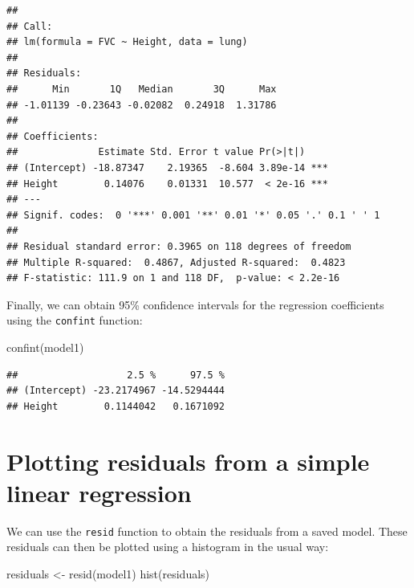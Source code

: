 \documentclass[
]{memoir}
\newenvironment{Shaded}{\begin{snugshade}}{\end{snugshade}}
\newcommand{\FunctionTok}[1]{\textcolor[rgb]{0.00,0.00,0.00}{#1}}
\newcommand{\NormalTok}[1]{#1}
\newcommand{\OtherTok}[1]{\textcolor[rgb]{0.56,0.35,0.01}{#1}}
\begin{document}
\begin{verbatim}
## 
## Call:
## lm(formula = FVC ~ Height, data = lung)
## 
## Residuals:
##      Min       1Q   Median       3Q      Max 
## -1.01139 -0.23643 -0.02082  0.24918  1.31786 
## 
## Coefficients:
##              Estimate Std. Error t value Pr(>|t|)    
## (Intercept) -18.87347    2.19365  -8.604 3.89e-14 ***
## Height        0.14076    0.01331  10.577  < 2e-16 ***
## ---
## Signif. codes:  0 '***' 0.001 '**' 0.01 '*' 0.05 '.' 0.1 ' ' 1
## 
## Residual standard error: 0.3965 on 118 degrees of freedom
## Multiple R-squared:  0.4867, Adjusted R-squared:  0.4823 
## F-statistic: 111.9 on 1 and 118 DF,  p-value: < 2.2e-16
\end{verbatim}

Finally, we can obtain 95\% confidence intervals for the regression coefficients using the \texttt{confint} function:

\begin{Shaded}
\begin{Highlighting}[]
\FunctionTok{confint}\NormalTok{(model1)}
\end{Highlighting}
\end{Shaded}

\begin{verbatim}
##                   2.5 %      97.5 %
## (Intercept) -23.2174967 -14.5294444
## Height        0.1144042   0.1671092
\end{verbatim}

\hypertarget{plotting-residuals-from-a-simple-linear-regression}{%
\section{Plotting residuals from a simple linear regression}\label{plotting-residuals-from-a-simple-linear-regression}}

We can use the \texttt{resid} function to obtain the residuals from a saved model. These residuals can then be plotted using a histogram in the usual way:

\begin{Shaded}
\begin{Highlighting}[]
\NormalTok{residuals }\OtherTok{\textless{}{-}} \FunctionTok{resid}\NormalTok{(model1)}
\FunctionTok{hist}\NormalTok{(residuals)}
\end{Highlighting}
\end{Shaded}
\end{document}
